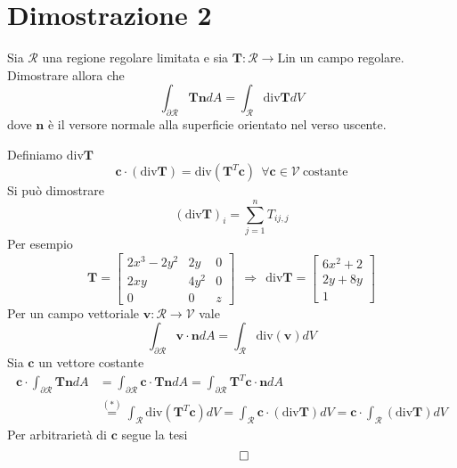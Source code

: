 \documentclass[10pt,a4paper,twoside]{book}
\begin{document}
\section{Dimostrazione 2}

Sia $\mathcal{R}$ una regione regolare limitata e sia $\mathbf{T} :\mathcal{R}\rightarrow \mathrm{Lin}$ un campo regolare. Dimostrare allora che
\begin{equation*}
\boxed{\int _{\partial \mathcal{R}}\mathbf{Tn} dA=\int _{\mathcal{R}}\mathrm{div}\mathbf{T} dV}
\end{equation*}
dove $\mathbf{n}$ è il versore normale alla superficie orientato nel verso uscente.



Definiamo $\mathrm{div}\mathbf{T}$
\begin{equation*}
\mathbf{c} \cdotp (\mathrm{div}\mathbf{T}) =\mathrm{div}\left(\mathbf{T}^{T}\mathbf{c}\right) \ \ \forall \mathbf{c} \in \mathcal{V} \ \text{costante}
\end{equation*}
Si può dimostrare
\begin{equation*}
(\mathrm{div}\mathbf{T})_{i} =\sum ^{n}_{j=1} T_{ij,j}
\end{equation*}
Per esempio
\begin{equation*}
\mathbf{T} =\begin{bmatrix}
2x^{3} -2y^{2} & 2y & 0\\
2xy & 4y^{2} & 0\\
0 & 0 & z
\end{bmatrix} \ \ \Rightarrow \ \ \mathrm{div}\mathbf{T} =\begin{bmatrix}
6x^{2} +2\\
2y+8y\\
1
\end{bmatrix}
\end{equation*}
Per un campo vettoriale $\mathbf{v} :\mathcal{R}\rightarrow \mathcal{V}$ vale
\begin{equation}
\int _{\partial \mathcal{R}}\mathbf{v} \cdotp \mathbf{n} dA=\int _{\mathcal{R}}\mathrm{div}(\mathbf{v}) dV \tag{*}
\end{equation}
Sia $\mathbf{c}$ un vettore costante
\begin{align*}
\mathbf{c} \cdotp \int _{\partial \mathcal{R}}\mathbf{Tn} dA & =\int _{\partial \mathcal{R}}\mathbf{c} \cdotp \mathbf{Tn} dA=\int _{\partial \mathcal{R}}\mathbf{T}^{T}\mathbf{c} \cdotp \mathbf{n} dA\\
 & \overset{( *)}{=}\int _{\mathcal{R}}\mathrm{div}\left(\mathbf{T}^{T}\mathbf{c}\right) dV=\int _{\mathcal{R}}\mathbf{c} \cdotp (\mathrm{div}\mathbf{T}) dV=\mathbf{c} \cdotp \int _{\mathcal{R}}(\mathrm{div}\mathbf{T}) dV
\end{align*}
Per arbitrarietà di $\mathbf{c}$ segue la tesi
\begin{equation*}
\qed 
\end{equation*}
\end{document}
